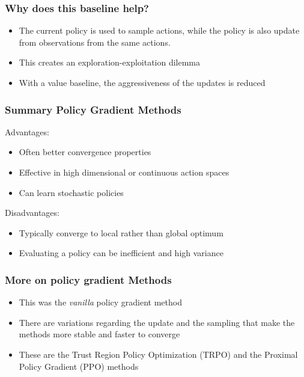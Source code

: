 \subsubsection*{Why does this baseline help?}
\begin{itemize}
    \item The current policy is used to sample actions, while the policy is also update from observations from the same actions.
    \item This creates an exploration-exploitation dilemma
    \item With a value baseline, the aggressiveness of the updates is reduced
\end{itemize}
\subsubsection{Summary Policy Gradient Methods}
Advantages:
\begin{itemize}
    \item Often better convergence properties
    \item Effective in high dimensional or continuous action spaces
    \item Can learn stochastic policies
\end{itemize}
Disadvantages:
\begin{itemize}
    \item Typically converge to local rather than global optimum
    \item Evaluating a policy can be inefficient and high variance
\end{itemize}
\subsubsection*{More on policy gradient Methods}
\begin{itemize}
    \item This was the \textit{vanilla} policy gradient method
    \item There are variations regarding the update and the sampling that make the methods more stable and faster to converge
    \item These are the Trust Region Policy Optimization (TRPO) and the Proximal Policy Gradient (PPO) methods
\end{itemize}

